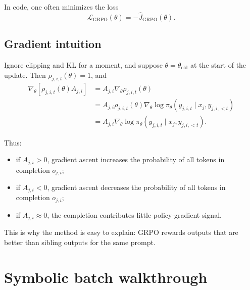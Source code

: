 \documentclass[11pt]{article}
\newcommand{\old}{\mathrm{old}}
\newcommand{\GRPO}{\mathrm{GRPO}}
\begin{document}
In code, one often minimizes the loss
\begin{equation}
\mathcal{L}_{\GRPO}(\theta)=-\widehat{J}_{\GRPO}(\theta).
\end{equation}

\subsection{Gradient intuition}

Ignore clipping and KL for a moment, and suppose $\theta=\theta_{\old}$ at the start of the update. Then $\rho_{j,i,t}(\theta)=1$, and
\begin{align}
\nabla_\theta \left[\rho_{j,i,t}(\theta)A_{j,i}\right]
&= A_{j,i}\nabla_\theta \rho_{j,i,t}(\theta) \\
&= A_{j,i}\rho_{j,i,t}(\theta)
\nabla_\theta \log \pi_\theta(y_{j,i,t}\mid x_j,y_{j,i,<t}) \\
&= A_{j,i}
\nabla_\theta \log \pi_\theta(y_{j,i,t}\mid x_j,y_{j,i,<t}).
\end{align}

Thus:
\begin{itemize}[leftmargin=*]
  \item if $A_{j,i}>0$, gradient ascent increases the probability of all tokens in completion $o_{j,i}$;
  \item if $A_{j,i}<0$, gradient ascent decreases the probability of all tokens in completion $o_{j,i}$;
  \item if $A_{j,i}\approx 0$, the completion contributes little policy-gradient signal.
\end{itemize}

This is why the method is easy to explain: GRPO rewards outputs that are better than sibling outputs for the same prompt.

\section{Symbolic batch walkthrough}
\end{document}
